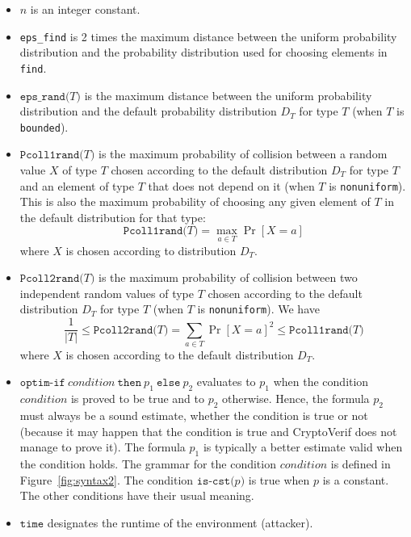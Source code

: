 \begin{itemize}
\item $n$ is an integer constant.

\item \texttt{eps\_find} is 2 times the maximum distance between the uniform probability
distribution and the probability distribution used for choosing elements
in {\tt find}.

\item $\texttt{eps\_rand(}T\texttt{)}$ is the maximum distance between the 
uniform probability distribution and the default probability distribution 
$D_T$ for type $T$ (when $T$ is \texttt{bounded}).

\item 
$\texttt{Pcoll1rand(}T\texttt{)}$ is the maximum probability of
collision between a random value $X$ of type $T$ chosen according
to the default distribution $D_T$ for type $T$ and an element of type $T$
that does not depend on it (when $T$ is \texttt{nonuniform}).
This is also the maximum probability of choosing any given element of 
$T$ in the default distribution for that type:
\[\texttt{Pcoll1rand(}T\texttt{)} = \max_{a \in T} \Pr[X = a]\]
where $X$ is chosen according to distribution $D_T$.

\item $\texttt{Pcoll2rand(}T\texttt{)}$ is the maximum probability of
collision between two independent random values of type $T$  
chosen according to the default distribution $D_T$ for type $T$
(when $T$ is \texttt{nonuniform}). We have
\[\frac{1}{|T|} \leq \texttt{Pcoll2rand(}T\texttt{)} = \sum_{a \in T} \Pr[X = a]^2 \leq \texttt{Pcoll1rand(}T\texttt{)}\]
where $X$ is chosen according to the default distribution $D_T$.

\item $\texttt{optim-if}\ \mathit{condition}\ \texttt{then}\ p_1\ \texttt{else}\ p_2$
evaluates to $p_1$ when the condition $\mathit{condition}$ is proved to be
true and to $p_2$ otherwise. Hence, the formula $p_2$ must always be a
sound estimate, whether the condition is true or not (because it may happen that
the condition is true and CryptoVerif does not manage to prove it). The formula
$p_1$ is typically a better estimate valid when the condition holds.
The grammar for the condition $\mathit{condition}$ is defined in Figure~\ref{fig:syntax2}.
The condition $\texttt{is-cst(}p\texttt{)}$ is true when $p$ is a constant.
The other conditions have their usual meaning.

\item $\texttt{time}$ designates the runtime of the environment (attacker).

\end{itemize}
